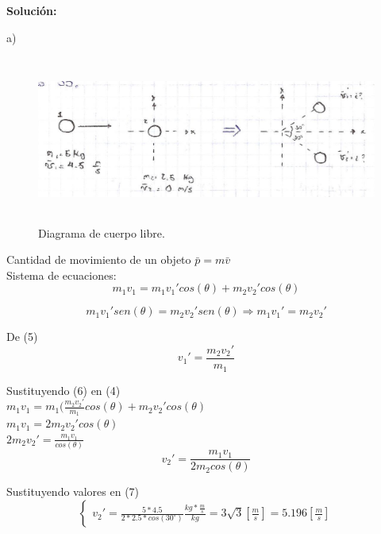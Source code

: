 \documentclass[a4paper,11pt]{scrartcl}
\begin{document}
\textbf{Solución:}

\begin{center}
a)\\
\hfill \break

\begin{figure}[H]
  \centering
  \includegraphics[height=5.5cm]{35_1}
  \caption{Diagrama de cuerpo libre.}
  \label{fig:35_1}
\end{figure}

Cantidad de movimiento de un objeto $\bar{p} = m \bar{v}$\\
\hfill \break
Sistema de ecuaciones:\\
\begin{equation}
  m_1 v_1 = m_1 {v_1}' cos(\theta) + m_2 {v_2}' cos(\theta)
\end{equation}

\begin{equation}
  m_1 {v_1}' sen(\theta) = m_2 {v_2}' sen(\theta) \Rightarrow m_1 {v_1}' = m_2 {v_2}'  
\end{equation}

De (5)\\
\hfill \break
\begin{equation}
  {v_1}' = \frac{m_2 {v_2}'}{m_1}
\end{equation}

Sustituyendo (6) en (4)\\
\hfill \break
$m_1 v_1 = m_1(\frac{m_2 {v_2}'}{m_1} cos(\theta) + m_2 {v_2}' cos(\theta)$\\
\hfill \break
$m_1 v_1 = 2 m_2 {v_2}' cos(\theta)$\\
\hfill \break
$2 m_2 {v_2}' = \frac{m_1 v_1}{cos(\theta)}$\\
\hfill \break
\begin{equation}
{v_2}' = \frac{m_1 v_1}{2 m_2 cos(\theta)}
\end{equation}

Sustituyendo valores en (7)\\
\hfill \break
\begin{equation*}
  \left\lbrace
  \begin{array}{l}
    {v_2}' = \frac{5 * 4.5}{2 * 2.5 * cos(30^\circ)} \frac{kg * \frac{m}{s}}{kg} = 3\sqrt{3} [\frac{m}{s}] = 5.196 [\frac{m}{s}]
  \end{array}
  \right.
\end{equation*}


\end{center}
\end{document}
